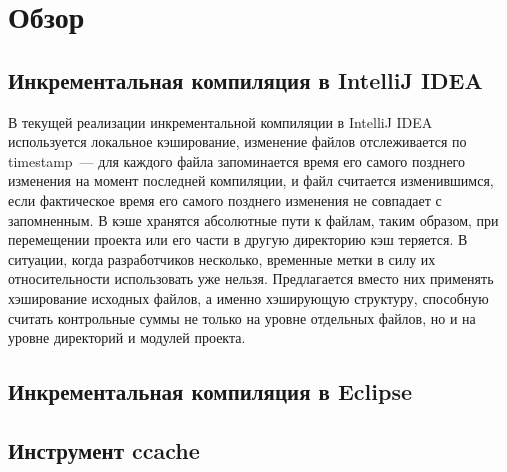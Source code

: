 \section{Обзор}

\subsection{Инкрементальная компиляция в IntelliJ IDEA}
В текущей реализации инкрементальной компиляции в IntelliJ IDEA используется локальное кэширование, изменение файлов отслеживается по timestamp~--- для каждого файла запоминается время его самого позднего изменения на момент последней компиляции, и файл считается изменившимся, если фактическое время его самого позднего изменения не совпадает с запомненным. В кэше хранятся абсолютные пути к файлам, таким образом, при перемещении проекта или его части в другую директорию кэш теряется. В ситуации, когда разработчиков несколько, временные метки в силу их относительности использовать уже нельзя. Предлагается вместо них применять хэширование исходных файлов, а именно хэширующую структуру, способную считать контрольные суммы не только на уровне отдельных файлов, но и на уровне директорий и модулей проекта.

\subsection{Инкрементальная компиляция в Eclipse}

\subsection{Инструмент ccache}